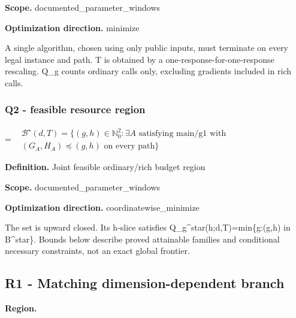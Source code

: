 \documentclass[10pt,a4paper]{article}
\newcommand{\AtlasMath}[1]{\par\begingroup\centering\setbox0=\hbox{$\displaystyle #1$}\ifdim\wd0>1.4\linewidth\typeout{ATLAS WIDE FORMULA: \the\wd0}\fi\ifdim\wd0>\linewidth\resizebox{\linewidth}{!}{\box0}\else\box0\fi\par\endgroup}
\begin{document}
\textbf{Scope.} documented\_parameter\_windows

\textbf{Optimization direction.} minimize

A single algorithm, chosen using only public inputs, must terminate on every legal instance and path. T is obtained by a one-response-for-one-response rescaling. Q\_g counts ordinary calls only, excluding gradients included in rich calls.

\subsubsection{Q2 - feasible resource region}
\AtlasMath{\begin{aligned}&\mathcal B^\star(d,T)=\{(g,h)\in\mathbb N_0^2:\exists A\text{ satisfying main/g1 with }\\[3pt]&(G_A,H_A)\preceq(g,h)\text{ on every path}\}\end{aligned}}
\textbf{Definition.} Joint feasible ordinary/rich budget region

\textbf{Scope.} documented\_parameter\_windows

\textbf{Optimization direction.} coordinatewise\_minimize

The set is upward closed. Its h-slice satisfies Q\_g\textasciicircum{}star(h;d,T)=min\{g:(g,h) in B\textasciicircum{}star\}. Bounds below describe proved attainable families and conditional necessary constraints, not an exact global frontier.

\subsection{R1 - Matching dimension-dependent branch}
\textbf{Region.} 
\end{document}
